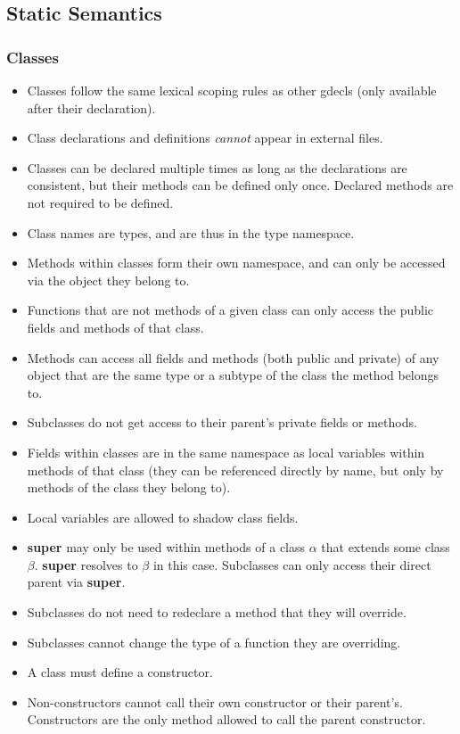 \documentclass{article}
\newcommand{\term}[1]{\textbf {#1}}
\begin{document}
\subsection{Static Semantics}
\subsubsection{Classes}
\begin{itemize}
\item Classes follow the same lexical scoping rules as other gdecls (only
      available after their declaration).
\item Class declarations and definitions \emph{cannot} appear in external files.
\item Classes can be declared multiple times as long as the declarations are
      consistent, but their methods can be defined only once. Declared methods
      are not required to be defined.
\item Class names are types, and are thus in the type namespace.
\item Methods within classes form their own namespace, and can only be accessed
      via the object they belong to.
\item Functions that are not methods of a given class can only access the public
      fields and methods of that class.
\item Methods can access all fields and methods (both public and private) of any
      object that are the same type or a subtype of the class the method belongs to.
\item Subclasses do not get access to their parent's private fields or methods.
\item Fields within classes are in the same namespace as local variables within
      methods of that class (they can be referenced directly by name, but only
      by methods of the class they belong to).
\item Local variables are allowed to shadow class fields.
\item \term{super} may only be used within methods of a class $\alpha$ that
      extends some class $\beta$. \term{super} resolves to $\beta$ in this
      case. Subclasses can only access their direct parent via \term{super}.
\item Subclasses do not need to redeclare a method that they will override.
\item Subclasses cannot change the type of a function they are overriding.
\item A class must define a constructor.
\item Non-constructors cannot call their own constructor or their parent's.
      Constructors are the only method allowed to call the parent constructor.
\end{itemize}
\end{document}
